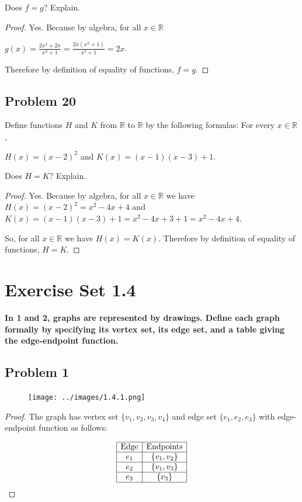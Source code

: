 \documentclass[14pt]{extarticle}
\newcommand{\dps}{\displaystyle}
\newcommand{\R}{\mathbb{R}}
\begin{document}
Does $f = g$? Explain.

\begin{proof}
    Yes. Because by algebra, for all $x \in \R$

    $\dps g(x) = \frac{2x^3 + 2x}{x^2 + 1} = \frac{2x(x^2 + 1)}{x^2 + 1} = 2x$.

    Therefore by definition of equality of functions, $f = g$.
\end{proof}

\subsection{Problem 20}
Define functions $H$ and $K$ from $\R$ to $\R$ by the following formulas:
For every $x \in \R$,

\begin{center}
    $H(x) = (x - 2)^2$ and $K(x) = (x - 1)(x - 3) + 1$.
\end{center}

Does $H = K$? Explain.

\begin{proof}
    Yes. Because by algebra, for all $x \in \R$ we have
    $H(x) = (x - 2)^2 = x^2 - 4x + 4$ and
    $K(x) = (x - 1)(x - 3) + 1 = x^2 - 4x + 3 + 1 = x^2 - 4x + 4$.

    So, for all $x \in \R$ we have $H(x) = K(x)$. Therefore by definition of
    equality of functions, $H = K$.
\end{proof}

\section {Exercise Set 1.4}

 {\bf In 1 and 2, graphs are represented by drawings. Define each graph
  formally by specifying its vertex set, its edge set, and a table giving the
  edge-endpoint function.}

\subsection{Problem 1}

\begin{figure}[ht!]
    \centering
    \texttt{[image: ../images/1.4.1.png]}
\end{figure}

\begin{proof}
    The graph has vertex set $\{v_1, v_2, v_3, v_4\}$ and edge set
    $\{e_1, e_2, e_3\}$ with edge-endpoint function as follows:

    $$
        \begin{array}{|c|c|}
            \hline
            \text{Edge} & \text{Endpoints} \\
            \hline
            e_1         & \{v_1, v_2\}     \\
            \hline
            e_2         & \{v_1, v_3\}     \\
            \hline
            e_3         & \{v_3\}          \\
            \hline
        \end{array}
    $$
\end{proof}
\end{document}

